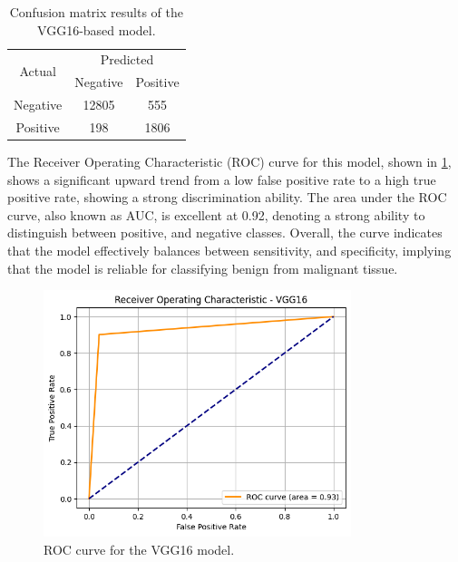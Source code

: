 \documentclass[../main]{subfiles}
\begin{document}
\begin{table}[h!]
    \centering
    \begin{tabular}{|c|c|c|}
        \hline
        \multirow{2}{*}{Actual} & \multicolumn{2}{c|}{Predicted} \\ \cline{2-3}
                                & Negative         & Positive         \\ \hline
        Negative                & 12805            & 555              \\ \hline
        Positive                & 198              & 1806              \\ \hline
    \end{tabular}
    \caption{Confusion matrix results of the VGG16-based model.}
    \label{tab:confusion-matrix-vgg16}
\end{table}

\noindent The Receiver Operating Characteristic (ROC) curve for this model, shown in \ref{fig:roc-vgg16}, shows a significant upward trend from a low false positive rate to a high true positive rate, showing a strong discrimination ability. The area under the ROC curve, also known as AUC, is excellent at 0.92, denoting a strong ability to distinguish between positive, and negative classes. Overall, the curve indicates that the model effectively balances between sensitivity, and specificity, implying that the model is reliable for classifying benign from malignant tissue.

\begin{figure}[h!]
	\centering
	\includegraphics[width=0.8\textwidth]{assets/roc_vgg16.png}
	\caption{ROC curve for the VGG16 model.}
    \label{fig:roc-vgg16}
\end{figure}
\end{document}
